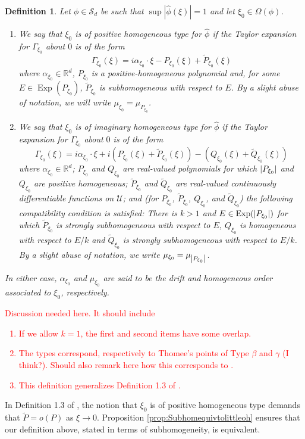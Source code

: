 \documentclass[11pt]{article}
\newtheorem{definition}[theorem]{Definition}
\newcommand\Exp{\operatorname{Exp}}
\begin{document}
\begin{definition}\label{def:Types}
Let $\phi\in\mathcal{S}_d$ be such that $\sup|\hat\phi(\xi)|=1$ and let $\xi_0\in\Omega(\phi)$. 
\begin{enumerate}
    \item We say that $\xi_0$ is of positive homogeneous type for $\widehat\phi$ if the Taylor expansion for $\Gamma_{\xi_0}$ about $0$ is of the form
\begin{equation}\label{eq:PosHomType}
\Gamma_{\xi_0}(\xi)=i\alpha_{\xi_0}\cdot\xi-P_{\xi_0}(\xi)+\widetilde{P}_{\xi_0}(\xi)
\end{equation}
where $\alpha_{\xi_0}\in\mathbb{R}^d$, $P_{\xi_0}$ is a positive-homogeneous polynomial and, for some $E\in \Exp(P_{\xi_0})$, $\widetilde{P}_{\xi_0}$ is subhomogeneous with respect to $E$. By a slight abuse of notation, we will write $\mu_{\xi_0}=\mu_{P_{\xi_0}}$.
\item We say that $\xi_0$ is of imaginary homogeneous type for $\widehat{\phi}$ if the Taylor expansion for $\Gamma_{\xi_0}$ about $0$ is of the form
\begin{equation*}
    \Gamma_{\xi_0}(\xi)=i\alpha_{\xi_0}\cdot\xi +i\left(P_{\xi_0}(\xi)+\widetilde{P}_{\xi_0}(\xi)\right)-\left(Q_{\xi_0}(\xi)+\widetilde{Q}_{\xi_0}(\xi)\right)
\end{equation*}
where $\alpha_{\xi_0}\in\mathbb{R}^d$; $P_{\xi_0}$ and $Q_{\xi_0}$ are real-valued polynomials for which $\abs{P_{\xi_0}}$ and $Q_{\xi_0}$ are positive homogeneous; $\widetilde{P}_{\xi_0}$ and $\widetilde{Q}_{\xi_0}$ are real-valued continuously differentiable functions on $\mathcal{U}$; and  (for $P_{\xi_0}$, $\widetilde{P}_{\xi_0}$, $Q_{\xi_0}$, and $\widetilde{Q}_{\xi_0}$) the following compatibility condition is satisfied: There is $k>1$ and $E\in\Exp(\abs{P_{\xi_0}})$ for which $\widetilde{P}_{\xi_0}$ is strongly subhomogeneous with respect to $E$, $Q_{\xi_0}$ is homogeneous with respect to $E/k$ and $\widetilde{Q}_{\xi_0}$ is strongly subhomogeneous with respect to $E/k$.  By a slight abuse of notation, we write $\mu_{\xi_0}=\mu_{\abs{P_{\xi_0}}}$.
\end{enumerate}
In either case, $\alpha_{\xi_0}$ and $\mu_{\xi_0}$ are said to be the drift and homogeneous order associated to $\xi_0$, respectively.
\end{definition}
\textcolor{red}{Discussion needed here. It should include
\begin{enumerate}
    \item If we allow $k=1$, the first and second items have some overlap. 
    \item The types correspond, respectively to Thomee's points of Type $\beta$ and $\gamma$ (I think?). Should also remark here how this corresponds to \cite{Randles2015}.
    \item This definition generalizes Definition 1.3 of \cite{Randles2017}.
\end{enumerate}}
In Definition 1.3 of \cite{Randles2017}, the notion that $\xi_0$ is of positive homogeneous type demands that $\widetilde{P}=o(P)$ as $\xi\to 0$. Proposition \ref{prop:Subhomequivtolittleoh} ensures that our definition above, stated in terms of subhomogeneity, is equivalent.
\end{document}
